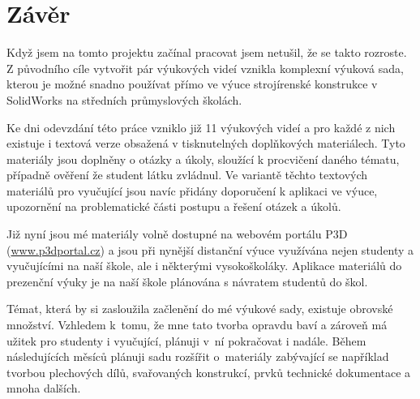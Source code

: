 \chapter*{Závěr}
Když jsem na tomto projektu začínal pracovat jsem netušil, že se takto rozroste.
Z původního cíle vytvořit pár výukových videí vznikla komplexní výuková sada, kterou je možné snadno používat přímo ve výuce strojírenské konstrukce v SolidWorks na středních průmyslových školách.

Ke dni odevzdání této práce vzniklo již 11 výukových videí a pro každé z nich existuje i textová verze obsažená v tisknutelných doplňkových materiálech.
Tyto materiály jsou doplněny o otázky a úkoly, sloužící k procvičení daného tématu, případně ověření že student látku zvládnul.
Ve variantě těchto textových materiálů pro vyučující jsou navíc přidány doporučení k aplikaci ve výuce, upozornění na problematické části postupu a řešení otázek a úkolů.

Již nyní jsou mé materiály volně dostupné na webovém portálu P3D (\href{https://www.p3dportal.cz}{www.p3dportal.cz}) a jsou při nynější distanční výuce využívána nejen studenty a vyučujícími na naší škole, ale i některými vysokoškoláky.
Aplikace materiálů do prezenční výuky je na naší škole plánována s návratem studentů do škol.

Témat, která by si zasloužila začlenění do mé výukové sady, existuje obrovské množství.
Vzhledem k~tomu, že mne tato tvorba opravdu baví a zároveň má užitek pro studenty i vyučující, plánuji v~ní pokračovat i nadále.
Během následujících měsíců plánuji sadu rozšířit o~materiály zabývající se například tvorbou plechových dílů, svařovaných konstrukcí, prvků technické dokumentace a mnoha dalších.

\newpage